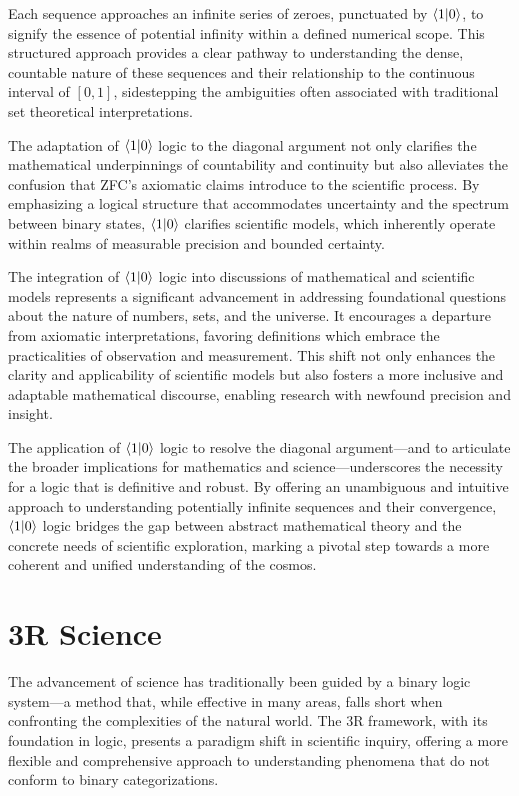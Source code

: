 \documentclass[12pt]{article}
\begin{document}
Each sequence approaches an infinite series of zeroes, punctuated by \(\langle 1 | 0 \rangle\), to signify the essence of potential infinity within a defined numerical scope. This structured approach provides a clear pathway to understanding the dense, countable nature of these sequences and their relationship to the continuous interval of \([0,1]\), sidestepping the ambiguities often associated with traditional set theoretical interpretations.

The adaptation of \(\langle 1 | 0 \rangle\) logic to the diagonal argument not only clarifies the mathematical underpinnings of countability and continuity but also alleviates the confusion that ZFC's  axiomatic claims introduce to the scientific process. By emphasizing a logical structure that accommodates uncertainty and the spectrum between binary states, \(\langle 1 | 0 \rangle\) clarifies scientific models, which inherently operate within realms of measurable precision and bounded certainty.

The integration of \(\langle 1 | 0 \rangle\) logic into discussions of mathematical and scientific models represents a significant advancement in addressing foundational questions about the nature of numbers, sets, and the universe. It encourages a departure from axiomatic interpretations, favoring definitions which embrace the practicalities of observation and measurement. This shift not only enhances the clarity and applicability of scientific models but also fosters a more inclusive and adaptable mathematical discourse, enabling research with newfound precision and insight.

The application of \(\langle 1 | 0 \rangle\) logic to resolve the diagonal argument—and to articulate the broader implications for mathematics and science—underscores the necessity for a logic that is definitive and robust. By offering an unambiguous and intuitive approach to understanding potentially infinite sequences and their convergence, \(\langle 1 | 0 \rangle\) logic bridges the gap between abstract mathematical theory and the concrete needs of scientific exploration, marking a pivotal step towards a more coherent and unified understanding of the cosmos.

\section*{3R Science}

The advancement of science has traditionally been guided by a binary logic system—a method that, while effective in many areas, falls short when confronting the complexities of the natural world. The 3R framework, with its foundation in \qbit{} logic, presents a paradigm shift in scientific inquiry, offering a more flexible and comprehensive approach to understanding phenomena that do not conform to binary categorizations.
\end{document}
